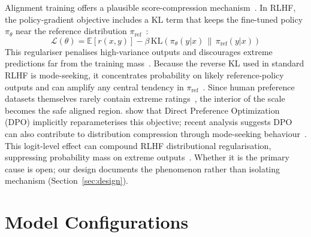 \documentclass[11pt]{article}
\begin{document}
Alignment training offers a plausible score-compression
mechanism~\citep{rafailov2023direct}. In RLHF, the policy-gradient
objective includes a KL term that keeps the fine-tuned policy
$\pi_\theta$ near the reference distribution $\pi_\text{ref}$~\citep{rafailov2023direct}:
\begin{equation}
    \mathcal{L}(\theta) = \mathbb{E}[r(x,y)] - \beta\,
    \text{KL}(\pi_\theta(y|x)\,\|\,\pi_\text{ref}(y|x))
    \label{eq:rlhf}
\end{equation}
This regulariser penalises high-variance outputs and discourages
extreme predictions far from the training mass~\citep{rafailov2023direct}.
Because the reverse KL used in standard RLHF is mode-seeking, it
concentrates probability on likely reference-policy outputs and can
amplify any central tendency in $\pi_\text{ref}$~\citep{rafailov2023direct}.
Since human preference datasets themselves rarely contain extreme
ratings~\citep{stevens1971issues}, the interior of the scale becomes the
safe aligned region. \citet{rafailov2023direct} show that Direct
Preference Optimization (DPO) implicitly reparameterises this objective;
recent analysis suggests DPO can also contribute to distribution
compression through mode-seeking behaviour~\citep{rafailov2023direct}.
This logit-level effect can compound RLHF distributional regularisation,
suppressing probability mass on extreme outputs~\citep{rafailov2023direct}.
Whether it is the primary cause is open; our design documents the
phenomenon rather than isolating mechanism (Section~\ref{sec:design}).



\section{Model Configurations}
\end{document}
